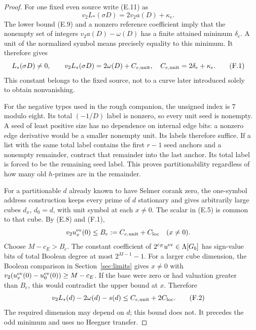 \documentclass[11pt]{article}
\theoremstyle{definition}
\theoremstyle{remark}
\begin{document}
\begin{proof}\leavevmode
For one fixed even source write (E.11) as
\[
             v_2L_*(\sigma D)=2v_2a(D)+\kappa_e.
\]
The lower bound (E.9) and a nonzero reference coefficient imply
that the nonempty set of integers
$v_2a(D)-\omega(D)$ has a finite attained minimum $\delta_e$.
A unit of the normalized symbol means precisely equality to this
minimum. It therefore gives
\[
 L_*(\sigma D)\ne0,\qquad
 v_2L_*(\sigma D)=2\omega(D)+C_{e,\rm unit},
 \quad C_{e,\rm unit}=2\delta_e+\kappa_e.                         \tag{F.1}
\]
This constant belongs to the fixed source, not to a curve later
introduced solely to obtain nonvanishing.

For the negative types used in the rough companion, the unsigned
index is $7$ modulo eight. Its total $(-1/D)$ label is nonzero, so
every unit seed is nonempty. A seed of least positive size has no
dependence on internal edge bits: a nonzero edge derivative
would be a smaller nonempty unit. Its labels therefore suffice.
If a list with the same total label contains the first $r-1$
seed anchors and a nonempty remainder, contract that remainder
into the last anchor. Its total label is forced to be the
remaining seed label. This proves partitionability regardless
of how many old $h$-primes are in the remainder.

For a partitionable $d$ already known to have Selmer corank zero,
the one-symbol address construction keeps every prime of $d$
stationary and gives arbitrarily large cubes $d_x$, $d_0=d$,
with unit symbol at each $x\ne0$. The scalar in (E.5) is common
to that cube. By (E.8) and (F.1),
\[
      v_2u_x^{\rm ev}(0)\le B_e:=C_{e,\rm unit}+C_{\rm loc}
                                      \quad(x\ne0).
\]
Choose $M-c_E>B_e$. The constant coefficient of
$2^{c_E}u^{\rm ev}\in\Lambda[G_b]$ has sign-value bits of total
Boolean degree at most $2^{M-1}-1$. For a larger cube dimension,
the Boolean comparison in Section~\ref{sec:limits} gives
$x\ne0$ with
$v_2(u_x^{\rm ev}(0)-u_0^{\rm ev}(0))\ge M-c_E$.
If the base were zero or had valuation greater than $B_e$, this
would contradict the upper bound at $x$. Therefore
\[
       v_2L_*(d)-2\omega(d)-s(d)
                       \le C_{e,\rm unit}+2C_{\rm loc}.          \tag{F.2}
\]
The required dimension may depend on $d$; this bound does not.
It precedes the odd minimum and uses no Heegner transfer.


\end{proof}
\end{document}
